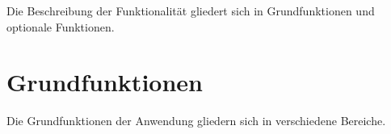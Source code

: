 
Die Beschreibung der Funktionalität gliedert sich in Grundfunktionen und optionale Funktionen.

\section{Grundfunktionen}

Die Grundfunktionen der Anwendung gliedern sich in verschiedene Bereiche.



